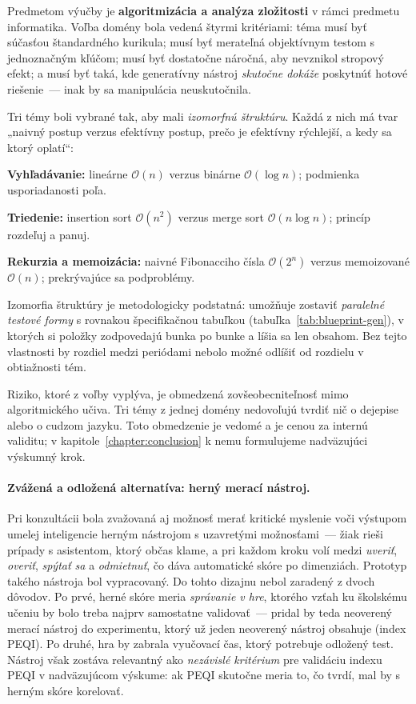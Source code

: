 Predmetom výučby je \textbf{algoritmizácia a analýza zložitosti} v rámci predmetu informatika. Voľba domény bola vedená štyrmi kritériami: téma musí byť súčasťou štandardného kurikula; musí byť merateľná objektívnym testom s jednoznačným kľúčom; musí byť dostatočne náročná, aby nevznikol stropový efekt; a musí byť taká, kde generatívny nástroj \emph{skutočne dokáže} poskytnúť hotové riešenie~--- inak by sa manipulácia neuskutočnila.

Tri témy boli vybrané tak, aby mali \emph{izomorfnú štruktúru}. Každá z nich má tvar „naivný postup verzus efektívny postup, prečo je efektívny rýchlejší, a kedy sa ktorý oplatí“:

\begin{description}[leftmargin=1.6cm, style=nextline, nosep]
    \item[T1] \textbf{Vyhľadávanie:} lineárne $\mathcal{O}(n)$ verzus binárne $\mathcal{O}(\log n)$; podmienka usporiadanosti poľa.
    \item[T2] \textbf{Triedenie:} insertion sort $\mathcal{O}(n^2)$ verzus merge sort $\mathcal{O}(n\log n)$; princíp rozdeľuj a panuj.
    \item[T3] \textbf{Rekurzia a memoizácia:} naivné Fibonacciho čísla $\mathcal{O}(2^n)$ verzus memoizované $\mathcal{O}(n)$; prekrývajúce sa podproblémy.
\end{description}

Izomorfia štruktúry je metodologicky podstatná: umožňuje zostaviť \emph{paralelné testové formy} s rovnakou špecifikačnou tabuľkou (tabuľka~\ref{tab:blueprint-gen}), v ktorých si položky zodpovedajú bunka po bunke a líšia sa len obsahom. Bez tejto vlastnosti by rozdiel medzi periódami nebolo možné odlíšiť od rozdielu v obtiažnosti tém.

Riziko, ktoré z voľby vyplýva, je obmedzená zovšeobecniteľnosť mimo algoritmického učiva. Tri témy z jednej domény nedovoľujú tvrdiť nič o dejepise alebo o cudzom jazyku. Toto obmedzenie je vedomé a je cenou za internú validitu; v kapitole~\ref{chapter:conclusion} k nemu formulujeme nadväzujúci výskumný krok.

\paragraph{Zvážená a odložená alternatíva: herný merací nástroj.} Pri konzultácii bola zvažovaná aj možnosť merať kritické myslenie voči výstupom umelej inteligencie herným nástrojom s uzavretými možnosťami~--- žiak rieši prípady s asistentom, ktorý občas klame, a pri každom kroku volí medzi \emph{uveriť}, \emph{overiť}, \emph{spýtať sa} a \emph{odmietnuť}, čo dáva automatické skóre po dimenziách. Prototyp takého nástroja bol vypracovaný. Do tohto dizajnu nebol zaradený z dvoch dôvodov. Po prvé, herné skóre meria \emph{správanie v hre}, ktorého vzťah ku školskému učeniu by bolo treba najprv samostatne validovať~--- pridal by teda neoverený merací nástroj do experimentu, ktorý už jeden neoverený nástroj obsahuje (index PEQI). Po druhé, hra by zabrala vyučovací čas, ktorý potrebuje odložený test. Nástroj však zostáva relevantný ako \emph{nezávislé kritérium} pre validáciu indexu PEQI v nadväzujúcom výskume: ak PEQI skutočne meria to, čo tvrdí, mal by s herným skóre korelovať.

